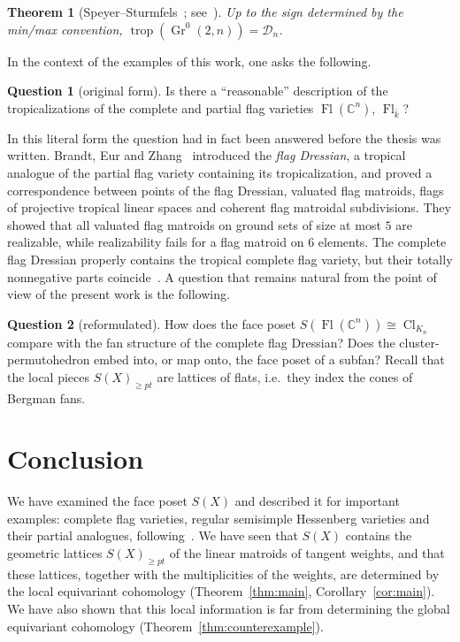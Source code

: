 \documentclass[11pt,a4paper]{article}
\numberwithin{equation}{section}
\theoremstyle{plain}
\newtheorem{theorem}{Theorem}[section]
\theoremstyle{definition}
\newtheorem{question}{Question}
\theoremstyle{remark}
\newcommand{\C}{\mathbb{C}}
\DeclareMathOperator{\Fl}{Fl}
\DeclareMathOperator{\Gr}{Gr}
\DeclareMathOperator{\Cl}{Cl}
\DeclareMathOperator{\trop}{trop}
\begin{document}
\begin{theorem}[Speyer--Sturmfels~\cite{SpS04}; see~{\cite[§4.3]{MS15}}]\label{thm:trop-gr}
Up to the sign determined by the min/max convention, $\trop(\Gr^0(2,n))=\mathcal D_n$.
\end{theorem}

In the context of the examples of this work, one asks the following.

\begin{question}[original form]\label{q:trop}
Is there a ``reasonable'' description of the tropicalizations of the complete and partial flag varieties $\Fl(\C^n)$, $\Fl_{\bar k}$?
\end{question}

In this literal form the question had in fact been answered before the thesis was written. Brandt, Eur and Zhang~\cite{BEZ21} introduced the \emph{flag Dressian}, a tropical analogue of the partial flag variety containing its tropicalization, and proved a correspondence between points of the flag Dressian, valuated flag matroids, flags of projective tropical linear spaces and coherent flag matroidal subdivisions. They showed that all valuated flag matroids on ground sets of size at most $5$ are realizable, while realizability fails for a flag matroid on $6$ elements. The complete flag Dressian properly contains the tropical complete flag variety, but their totally nonnegative parts coincide~\cite{Bor21}. A question that remains natural from the point of view of the present work is the following.

\begin{question}[reformulated]\label{q:trop2}
How does the face poset $S(\Fl(\C^n))\cong\Cl_{K_n}$ compare with the fan structure of the complete flag Dressian? Does the cluster-permutohedron embed into, or map onto, the face poset of a subfan? Recall that the local pieces $S(X)_{\geqslant pt}$ are lattices of flats, i.e.\ they index the cones of Bergman fans.
\end{question}

\section{Conclusion}\label{sec:conclusion}

We have examined the face poset $S(X)$ and described it for important examples: complete flag varieties, regular semisimple Hessenberg varieties and their partial analogues, following~\cite{AB21,AB24}. We have seen that $S(X)$ contains the geometric lattices $S(X)_{\geqslant pt}$ of the linear matroids of tangent weights, and that these lattices, together with the multiplicities of the weights, are determined by the local equivariant cohomology (Theorem~\ref{thm:main}, Corollary~\ref{cor:main}). We have also shown that this local information is far from determining the global equivariant cohomology (Theorem~\ref{thm:counterexample}).
\end{document}
